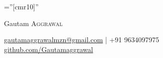 \documentclass[a4paper,1pt]{article}
\begin{document}

\pagestyle{empty} %

\font\fb=''[cmr10]'' %

\par{\centering
		{\Huge Gautam \textsc{Aggrawal}
		
	}\href{mailto:gautamaggrawalmzn@gmail.com}{gautamaggrawalmzn@gmail.com} | +91 9634097975\\
	\href{https://github.com/Gautamaggrawal}{github.com/Gautamaggrawal}\bigskip\par}

%

\end{document}
